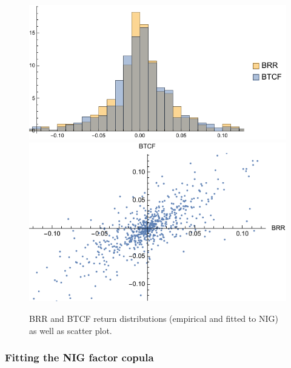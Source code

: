 \begin{figure}[t]
  \centering
  \includegraphics[scale=.7]{_pics/fittedNIG.pdf} 
  \includegraphics[scale=.7]{_pics/scatter.pdf}
  \caption{BRR and BTCF return distributions (empirical and fitted to
    NIG) as well as scatter plot.}
  \label{fig:nig}
\end{figure}

\subsubsection{Fitting the NIG factor copula}
\label{sec:fitting-nig-factor}

